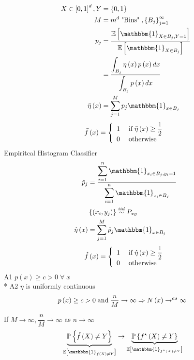 \documentclass{article}
\begin{document}
\begin{align*}
X  \in \left[0, 1\right]^{d}, Y &= \left\{0, 1\right\}
\\ M  &= m^{d} \text{\;"Bins"\;}, \left\{B_{j}\right\}_{j=1}^{\infty}
\\ p_{j} &= \dfrac{\mathbb{E}\left[\mathbbm{1}_{X \in B_{j}, Y = 1}\right]}{\mathbb{E}\left[\mathbbm{1}_{X \in B_{j}}\right]}
\\ &= \dfrac{\displaystyle\int_{B_{j}} \eta\left(x\right) p\left(x\right) d x}{\displaystyle\int_{B_{j}} p\left(x\right) d x}
\\ \bar{\eta}\left(x\right) &= \displaystyle\sum_{j=1}^{M} p_{j} \mathbbm{1}_{x \in B_{j}}
\end{align*}
\[ \bar{f}\left(x\right) =\left\{ \begin{array}{ll}
1& \text{\;if\;} \bar{\eta}\left(x\right) \geq  \dfrac{1}{2} \\
0& \text{\;otherwise\;} \\
\end{array}\right. \]
Empiritcal Histogram Classifier
\begin{align*}
\hat{p}_{j} &= \dfrac{\displaystyle\sum_{i=1}^{n} \mathbbm{1}_{x_{i} \in B_{j}, y_{i} = 1}}{\displaystyle\sum_{i=1}^{n} \mathbbm{1}_{x_{i} \in B_{j}}}
\\ &  \left\{\left(x_{i}, y_{j}\right)\right\} \stackrel{iid}{\sim} P_{x y}
\\ \hat{\eta}\left(x\right) &= \displaystyle\sum_{j=1}^{M} \hat{p}_{j} \mathbbm{1}_{x \in B_{j}}
\end{align*}
\[ \hat{f}\left(x\right) =\left\{ \begin{array}{ll}
1& \text{\;if\;} \hat{\eta}\left(x\right) \geq  \dfrac{1}{2} \\
0& \text{\;otherwise\;} \\
\end{array}\right. \]
A1 $p\left(x\right)  \geq  c > 0 \;\forall\; x $
\\* A2 $\eta$ is uniformly continuous
\begin{align*}
p\left(x\right)  &\geq  c > 0 \text{\;and\;} \dfrac{n}{M} \to  \infty \Rightarrow  N\left(x\right) \to ^{as} \infty
\end{align*}
\begin{thm} \label{thm:ehc} 
If $M  \to  \infty, \dfrac{n}{M} \to  \infty$ as $n  \to  \infty$
\begin{align*}
&\underbrace{\mathbb{P}\left\{\hat{f}\left(X\right) \neq  Y\right\}}_{\mathbb{E}\left[\mathbbm{1}_{\hat{f}\left(X\right) \neq  Y}\right]} \to  \underbrace{\mathbb{P}\left\{f^\star \left(X\right) \neq  Y \right\}}_{\mathbb{E}\left[\mathbbm{1}_{f^\star \left(X\right) \neq  Y}\right]}
\end{align*}\end{thm}
\end{document}
